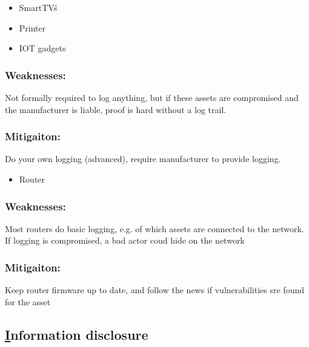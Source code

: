\documentclass[
	letterpaper, %
	10pt, %
	unnumberedsections, %
	twoside, %
]{APAAssignment}
\begin{document}
\begin{singlespace}

	\begin{itemize}
		\item SmartTV\'s
		\item Printer 
		\item IOT gadgets 
	\end{itemize}
	
	\subsubsection{Weaknesses:} Not formally required to log anything, but if these assets are compromised and the manufacturer is liable, proof is hard without a log trail. 
	\subsubsection{Mitigaiton:} Do your own logging (advanced), require manufacturer to provide logging.
	
	\begin{itemize}
		\item Router
	\end{itemize}
	
	\subsubsection{Weaknesses:} Most routers do basic logging, e.g. of which assets are connected to the network. If logging is compromised, a bad actor  coud hide on the network
	\subsubsection{Mitigaiton:} Keep router firmware up to date, and follow the news if vulnerabilities sre found for the asset
		
\end{singlespace}


\subsection{\underline{I}nformation disclosure}
\end{document}
